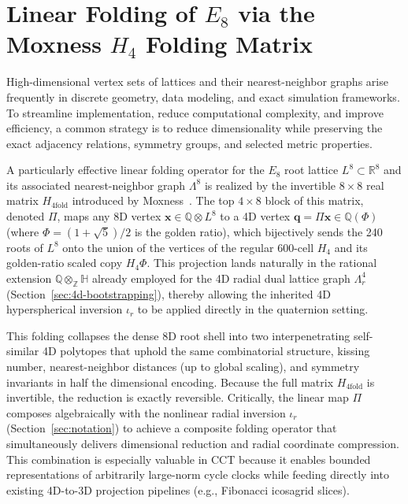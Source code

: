 \documentclass{article}
\begin{document}
\section{Linear Folding of \(E_8\) via the Moxness \(H_4\) Folding Matrix}
\label{sec:h4-folding}

High-dimensional vertex sets of lattices and their nearest-neighbor graphs arise frequently in discrete geometry, data modeling, and exact simulation frameworks. To streamline implementation, reduce computational complexity, and improve efficiency, a common strategy is to reduce dimensionality while preserving the exact adjacency relations, symmetry groups, and selected metric properties.

A particularly effective linear folding operator for the \(E_8\) root lattice \(L^8 \subset \mathbb{R}^8\) and its associated nearest-neighbor graph \(\Lambda^8\) is realized by the invertible \(8 \times 8\) real matrix \(H_{4\mathrm{fold}}\) introduced by Moxness~\cite{Moxness2014}. The top \(4 \times 8\) block of this matrix, denoted \(\Pi\), maps any 8D vertex \(\mathbf{x} \in \mathbb{Q} \otimes L^8\) to a 4D vertex \(\mathbf{q} = \Pi \mathbf{x} \in \mathbb{Q}(\Phi)\) (where \(\Phi = (1 + \sqrt{5})/2\) is the golden ratio), which bijectively sends the 240 roots of \(L^8\) onto the union of the vertices of the regular 600-cell \(H_4\) and its golden-ratio scaled copy \(H_4\Phi\). This projection lands naturally in the rational extension \(\mathbb{Q} \otimes_{\mathbb{Z}} \mathbb{H}\) already employed for the 4D radial dual lattice graph \(\Lambda_r^4\) (Section~\ref{sec:4d-bootstrapping}), thereby allowing the inherited 4D hyperspherical inversion \(\iota_r\) to be applied directly in the quaternion setting.

This folding collapses the dense 8D root shell into two interpenetrating self-similar 4D polytopes that uphold the same combinatorial structure, kissing number, nearest-neighbor distances (up to global scaling), and symmetry invariants in half the dimensional encoding. Because the full matrix \(H_{4\mathrm{fold}}\) is invertible, the reduction is exactly reversible. Critically, the linear map \(\Pi\) composes algebraically with the nonlinear radial inversion \(\iota_r\) (Section~\ref{sec:notation}) to achieve a composite folding operator that simultaneously delivers dimensional reduction and radial coordinate compression. This combination is especially valuable in CCT because it enables bounded representations of arbitrarily large-norm cycle clocks while feeding directly into existing 4D-to-3D projection pipelines (e.g., Fibonacci icosagrid slices).
\end{document}
